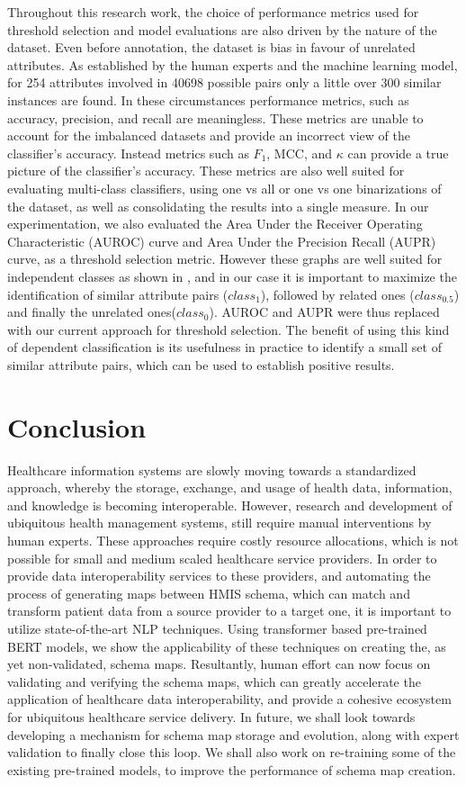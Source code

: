 \documentclass{ieeeaccess}
\begin{document}
Throughout this research work, the choice of performance metrics used for threshold selection and model evaluations are also driven by the nature of the dataset. Even before annotation, the dataset is bias in favour of unrelated attributes. As established by the human experts and the machine learning model, for 254 attributes involved in 40698 possible pairs only a little over 300 similar instances are found. In these circumstances performance metrics, such as accuracy, precision, and recall are meaningless. These metrics are unable to account for the imbalanced datasets and provide an incorrect view of the classifier's accuracy. Instead metrics such as $F_1$, MCC, and $\kappa$ can provide a true picture of the classifier's accuracy. These metrics are also well suited for evaluating multi-class classifiers, using one vs all or one vs one binarizations of the dataset, as well as consolidating the results into a single measure. In our experimentation, we also evaluated the Area Under the Receiver Operating Characteristic (AUROC) curve and Area Under the Precision Recall (AUPR) curve, as a threshold selection metric. However these graphs are well suited for independent classes as shown in \cite{espindola2005extending}, and in our case it is important to maximize the identification of similar attribute pairs ($class_1$), followed by related ones ($class_{0.5}$) and finally the unrelated ones($class_0$). AUROC and AUPR were thus replaced with our current approach for threshold selection. The benefit of using this kind of dependent classification is its usefulness in practice to identify a small set of similar attribute pairs, which can be used to establish positive results.

\section{Conclusion}
\label{conclusion}
Healthcare information systems are slowly moving towards a standardized approach, whereby the storage, exchange, and usage of health data, information, and knowledge is becoming interoperable. However, research and development of ubiquitous health management systems, still require manual interventions by human experts. These approaches require costly resource allocations, which is not possible for small and medium scaled healthcare service providers. In order to provide data interoperability services to these providers, and automating the process of generating maps between HMIS schema, which can match and transform patient data from a source provider to a target one, it is important to utilize state-of-the-art NLP techniques. Using transformer based pre-trained BERT models, we show the applicability of these techniques on creating the, as yet non-validated, schema maps. Resultantly, human effort can now focus on validating and verifying the schema maps, which can greatly accelerate the application of healthcare data interoperability, and provide a cohesive ecosystem for ubiquitous healthcare service delivery.
In future, we shall look towards developing a mechanism for schema map storage and evolution, along with expert validation to finally close this loop. We shall also work on re-training some of the existing pre-trained models, to improve the performance of schema map creation.
\end{document}
